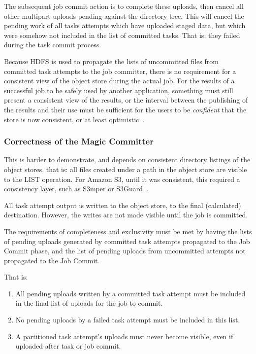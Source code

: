 \documentclass[format=acmsmall, screen=true, nonacm, timestamp, review=false]{acmart}
\begin{document}
The subsequent job commit action is to complete these uploads,
then cancel all other multipart uploads pending against the directory tree.
This will cancel the pending work of all tasks attempts which have uploaded staged
data, but which were somehow not included in the list of committed tasks.
That is: they failed during the task commit process.

Because HDFS is used to propagate the lists of uncommitted files from
committed task attempts to the job committer, there is no requirement for
a consistent view of the object store during the actual job.
For the results of a successful job to be safely used by another application,
something must still present a consistent view of the results, or
the interval between the publishing of the results and their use must be sufficient
for the users to be \emph{confident} that the store is now consistent,
or at least optimistic\ \cite{Bermbach:2014:BEC:2624303.2624662}.



\subsubsection{Correctness of the Magic Committer}

This is harder to demonstrate, and depends on consistent directory
listings of the object stores, that is: all files created under a path
in the object store are visible to the LIST operation.
For Amazon S3, until it was consistent, this required a consistency layer,
such as S3mper or S3Guard\ \cite{S3mper,HADOOP-13345}.

All task attempt output is written to the object store, to the final (calculated)
destination.
However, the writes are not made visible until the job is committed.

The requirements of completeness and exclusivity must be met by
having the lists of pending uploads generated by committed task attempts propagated
to the Job Commit phase, and the list of pending uploads from uncommitted
attempts not propagated to the Job Commit.

That is:

\begin{enumerate}
  \item All pending uploads written by a committed task attempt must be
  included in the final list of uploads for the job to commit.
  \item No pending uploads by a failed task attempt must be included in this list.
  \item A partitioned task attempt's uploads must never become visible,
  even if uploaded after task or job commit.
\end{enumerate}
\end{document}
